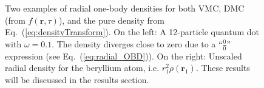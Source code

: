 \begin{figure}
 \begin{center}
  \caption{Two examples of radial one-body densities for both VMC, DMC (from $f(\mathbf{r}, \tau)$), and the pure density from Eq.~(\ref{eq:densityTransform}). On the left: A 12-particle quantum dot with $\omega=0.1$. The density diverges close to zero due to a ``$\frac{0}{0}$'' expression (see Eq.~(\ref{eq:radial_OBD})). On the right: Unscaled radial density for the beryllium atom, i.e. $r_1^2\rho(\mathbf{r}_1)$. These results will be discussed in the results section.}
  \label{fig:OBD_ex}
 \end{center}
\end{figure}

